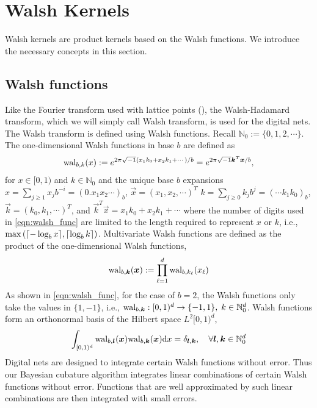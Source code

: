 \documentclass{svjour3}                     %
\newcommand{\bm}[1]{\boldsymbol{#1}}
\newcommand{\dif}[1]{\text{d}{#1}}
\newcommand{\naturals}{\mathbb{N}}
\newcommand{\vk}{\bm{k}}
\newcommand{\vl}{\bm{l}}
\newcommand{\vx}{\bm{x}}
\newcommand{\dx}{\dif{{x}}}
\DeclarePairedDelimiter{\ceil}{\lceil}{\rceil}
\begin{document}
\section{Walsh Kernels}

Walsh kernels are product kernels based on the Walsh functions. We introduce the necessary concepts in this section.

\subsection{Walsh functions}
Like the Fourier transform used with lattice points (\cite{JagHic19a}), the Walsh-Hadamard transform, which we will simply call Walsh transform, is used for the digital nets. The Walsh transform is defined using Walsh functions. Recall $\naturals_0 := \lbrace 0,1,2,\cdots \rbrace$.
The one-dimensional Walsh functions in base $b$ are defined as
\begin{align}
\label{eqn:walsh_func}
\textup{wal}_{b,k}(x) := e^{2\pi \sqrt{-1} (x_1 k_0 + x_2 k_1 + \cdots)/b} 
=
e^{2\pi \sqrt{-1} {\vec{k}}^T{\vec{x}}/b},
\end{align}
for $x \in [0,1)$ and $k \in \naturals_0$ and the unique base $b$ expansions 
$x = \sum_{j \ge 1} x_j b^{-i} = (0.x_1 x_2 \cdots)_b$, $\vec{x} =  (x_1,x_2,\cdots )^T$
$k = \sum_{j \ge 0} k_j b^{j} = ( \cdots k_1 k_0)_b$, $\vec{k} =  (k_0,k_1,\cdots )^T$, and ${\vec{k}}^T{\vec{x}} = x_1 k_0 + x_2 k_1 + \cdots$
where the number of digits used in \eqref{eqn:walsh_func} are limited to the length required to represent $x$ or $k$, i.e., $\max \left( {\ceil{ -\log_b{x}}, \ceil{\log_b{k}}  } \right)$.
Multivariate Walsh functions are defined as the product of the one-dimensional Walsh functions,
\begin{align*}
\textup{wal}_{b,\vk} (\vx) := \prod_{\ell=1}^d \textup{wal}_{b,k_\ell} (x_\ell
)
\end{align*}
As shown in \eqref{eqn:walsh_func}, for the case of $b=2$, the Walsh functions only take the values in $\{1, -1\}$, i.e., $\textup{wal}_{b,\vk} : [0,1)^d \to {\{-1, 1\}} , \; k \in \naturals_0^d$. Walsh functions form an orthonormal basis of the Hilbert space $L^2[0,1)^d$,
\begin{align*}
\int_{[0,1)^d}
\textup{wal}_{b,\vl} (\vx) \textup{wal}_{b,\vk}(\vx) \dx = \delta_{\vl, \vk}, \quad \forall \vl, \vk \in \naturals_0^d
\end{align*}
Digital nets are designed to integrate certain Walsh functions without error.
Thus our Bayesian cubature algorithm integrates linear combinations of %
certain Walsh functions without error. Functions that are well approximated by such linear combinations are then integrated with small errors.
\end{document}
